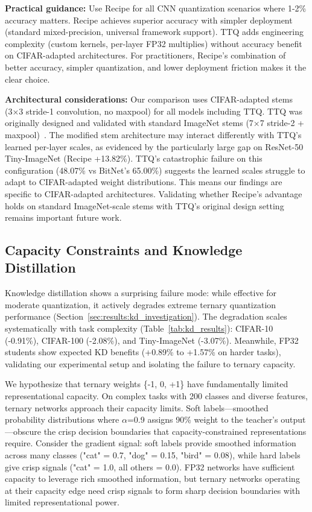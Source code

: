 \textbf{Practical guidance:} Use Recipe for all CNN quantization scenarios where 1-2\% accuracy matters. Recipe achieves superior accuracy with simpler deployment (standard mixed-precision, universal framework support). TTQ adds engineering complexity (custom kernels, per-layer FP32 multiplies) without accuracy benefit on CIFAR-adapted architectures. For practitioners, Recipe's combination of better accuracy, simpler quantization, and lower deployment friction makes it the clear choice.

\textbf{Architectural considerations:} Our comparison uses CIFAR-adapted stems (3×3 stride-1 convolution, no maxpool) for all models including TTQ. TTQ was originally designed and validated with standard ImageNet stems (7×7 stride-2 + maxpool)~\cite{zhu2017ttq}. The modified stem architecture may interact differently with TTQ's learned per-layer scales, as evidenced by the particularly large gap on ResNet-50 Tiny-ImageNet (Recipe +13.82\%). TTQ's catastrophic failure on this configuration (48.07\% vs BitNet's 65.00\%) suggests the learned scales struggle to adapt to CIFAR-adapted weight distributions. This means our findings are specific to CIFAR-adapted architectures. Validating whether Recipe's advantage holds on standard ImageNet-scale stems with TTQ's original design setting remains important future work.

\subsection{Capacity Constraints and Knowledge Distillation}
\label{sec:discussion:capacity}

Knowledge distillation shows a surprising failure mode: while effective for moderate quantization, it actively degrades extreme ternary quantization performance (Section~\ref{sec:results:kd_investigation}). The degradation scales systematically with task complexity (Table~\ref{tab:kd_results}): CIFAR-10 (-0.91\%), CIFAR-100 (-2.08\%), and Tiny-ImageNet (-3.07\%). Meanwhile, FP32 students show expected KD benefits (+0.89\% to +1.57\% on harder tasks), validating our experimental setup and isolating the failure to ternary capacity.

We hypothesize that ternary weights \{-1, 0, +1\} have fundamentally limited representational capacity. On complex tasks with 200 classes and diverse features, ternary networks approach their capacity limits. Soft labels—smoothed probability distributions where $\alpha$=0.9 assigns 90\% weight to the teacher's output—obscure the crisp decision boundaries that capacity-constrained representations require. Consider the gradient signal: soft labels provide smoothed information across many classes ("cat" = 0.7, "dog" = 0.15, "bird" = 0.08), while hard labels give crisp signals ("cat" = 1.0, all others = 0.0). FP32 networks have sufficient capacity to leverage rich smoothed information, but ternary networks operating at their capacity edge need crisp signals to form sharp decision boundaries with limited representational power.

